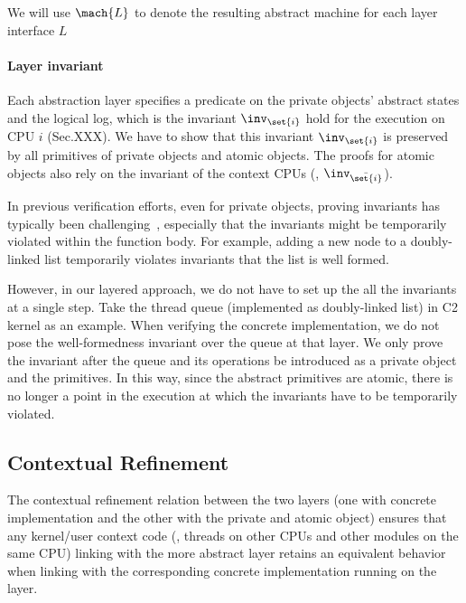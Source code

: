 {We will use $\mach{L}$ to denote the resulting abstract machine for
each layer interface $L$





\paragraph{Layer invariant}
Each abstraction layer specifies a predicate
on the private objects' abstract states
and the logical log,
which is the invariant $\inv_{\set{i}}$ hold for the execution on CPU $i$
(\cf Sec.XXX).
We have to show that this invariant $\inv_{\set{i}}$ is preserved
by all primitives of private objects and atomic objects.
The proofs for atomic  objects also rely on the
invariant of the context CPUs (\ie, $\inv_{\bar{\set{i}}}$).

In previous verification efforts, even for private objects,
proving invariants has typically been challenging~\cite{klein2009sel4},
especially that the invariants might be temporarily violated within the function body.
For example, adding a new node to a doubly-linked list
temporarily violates invariants that the list is well formed.

However, in our layered approach,
we do not have to set up the all the invariants at a single step.
Take the thread queue (implemented as doubly-linked list) in C2 kernel as an example.
When verifying the concrete implementation, we do not pose the well-formedness invariant
over the queue at that layer.
We only prove the invariant after the queue and its operations be introduced as a private object and the primitives.
In this way,
since the abstract primitives are atomic,
there is no longer a point in the execution
at which the invariants have to be temporarily violated.




\subsection{Contextual Refinement}
The contextual refinement relation between
the two layers (one with concrete implementation and the other
with the private and atomic object) ensures that any kernel/user context code 
(\ie, threads on other CPUs and other modules on the same CPU)
linking with the more abstract layer retains an
equivalent behavior when linking with the corresponding
concrete implementation running on the layer.

}

